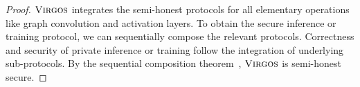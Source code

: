 \begin{proof}
    $\textnormal{\textsc{Virgos}}$ integrates the semi-honest protocols for all elementary operations like graph convolution and activation layers.
To obtain the secure inference or training protocol, we can sequentially compose the relevant protocols.
Correctness and %
security of private inference or training follow the integration of underlying sub-protocols.
By the sequential composition theorem~\cite{joc/Canetti00}, 
$\textnormal{\textsc{Virgos}}$ is semi-honest secure.
\end{proof}
